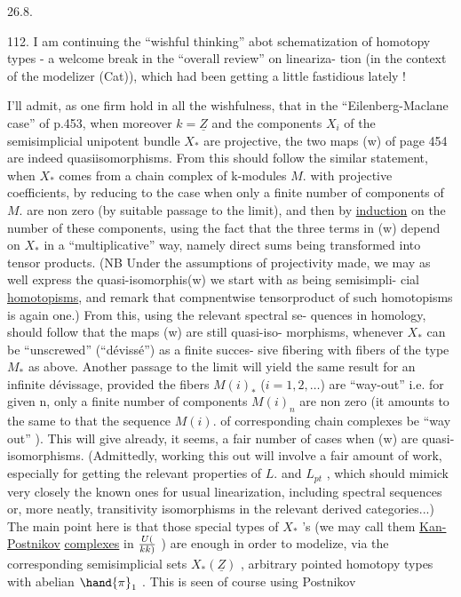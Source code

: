
26.8.

112. I am continuing the ``wishful thinking'' abot schematization of
homotopy types - a welcome break in the ``overall review'' on lineariza-%
tion  (in the context of the modelizer (Cat)), which had been getting
a little fastidious lately !

I'll admit, as one firm hold in all the wishfulness, that in the
``Eilenberg-Maclane case'' of p.453, when moreover $k=\underline{Z}$ and the components
$X_i$ of the semisimplicial unipotent bundle $X_*$ are projective, the two
maps (w) of page 454 are indeed quasiisomorphisms. From this should
follow the similar statement, when $X_*$ comes from a chain complex of
k-modules $M.$ with projective coefficients, by reducing to the case
when only a finite number of components of $M.$ are non zero (by suitable
\margin{!} passage to the limit), and then by \uline{induction} on the number of these
components, using the fact that the three terms in (w) depend on $X_*$ in
a ``multiplicative'' way, namely direct sums being transformed into tensor
products. (NB Under the assumptions of projectivity made, we may as
well express the quasi-isomorphis(w) we start with as being semisimpli-%
cial \uline{homotopisms}, and remark that compnentwise tensorproduct of such
homotopisms is again one.) From this, using the relevant spectral se-%
quences in homology, should follow that the maps (w) are still quasi-iso-%
morphisms, whenever $X_*$ can be ``unscrewed'' (``dévissé'') as a finite succes-%
sive fibering with fibers of the type $M_*$ as above. Another passage to
the limit will yield the same result for an infinite dévissage, provided
the fibers $M(i)_*$ ($i=1,2, \ldots$) are ``way-out'' i.e. for given n, only
a finite number of components $M(i)_n$ are non zero (it amounts to the
same to  that the sequence $M(i).$ of corresponding chain complexes
be ``way out'' ). This will give already, it seems, a fair number of
cases when (w) are quasi-isomorphisms. (Admittedly, working this out will
involve a fair amount of work, especially for getting the relevant
properties of $L.$ and $L_{pt}$ , which should mimick very closely the known
ones for usual linearization, including spectral sequences or, more
neatly, transitivity isomorphisms in the relevant derived categories...)
The main point here is that those special types of $X_*$ 's (we may call
them \uline{Kan-Postnikov} \uline{complexes} in $U(\over{k}{k})$ ) are enough in order to modelize,
via the corresponding semisimplicial sets $X_*(\underline{Z})$ , arbitrary  pointed
homotopy types with abelian $\hand{\pi}_1$ . This is seen of course using Postnikov


